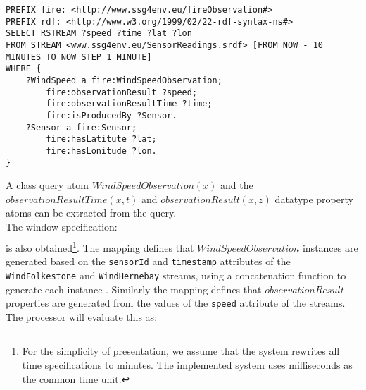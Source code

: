 \begin{lstlisting}[style=SPARQLSTRStyle,language=SPARQLSTR,frame=none,float,label=
list:query-example,caption=\sparqlstr query which every minute returns the wind speed for the last ten minutes.]
PREFIX fire: <http://www.ssg4env.eu/fireObservation#>
PREFIX rdf: <http://www.w3.org/1999/02/22-rdf-syntax-ns#>
SELECT RSTREAM ?speed ?time ?lat ?lon
FROM STREAM <www.ssg4env.eu/SensorReadings.srdf> [FROM NOW - 10 MINUTES TO NOW STEP 1 MINUTE]
WHERE {
	?WindSpeed a fire:WindSpeedObservation;
		fire:observationResult ?speed;
		fire:observationResultTime ?time;
		fire:isProducedBy ?Sensor.
  	?Sensor a fire:Sensor; 
		fire:hasLatitute ?lat;
		fire:hasLonitude ?lon.
}
\end{lstlisting}


A class query atom $WindSpeedObservation(x)$ and the $observationResultTime(x,t)$ and  $observationResult(x,z)$ datatype property atoms can be extracted from the \sparqlstr query. \\
The window specification:
\begin{align*}
 [t_s=\textsf{\small{NOW}}-10,t_e=\textsf{\small{NOW}},\delta=1]
\end{align*}
 is also obtained\footnote{For the simplicity of presentation, we assume that the system rewrites all time specifications to minutes.
The implemented system uses milliseconds as the common time unit.}.
The \stwoo mapping defines that $WindSpeedObservation$ instances are generated based on the \texttt{sensorId} and \texttt{timestamp} attributes of the \texttt{WindFolkestone} and \texttt{WindHernebay} streams, using a concatenation function to generate each instance \uri.
Similarly the \stwoo mapping defines that $observationResult$ properties are generated from the values of the \texttt{speed} attribute of the streams. \\
The processor will evaluate this as:
